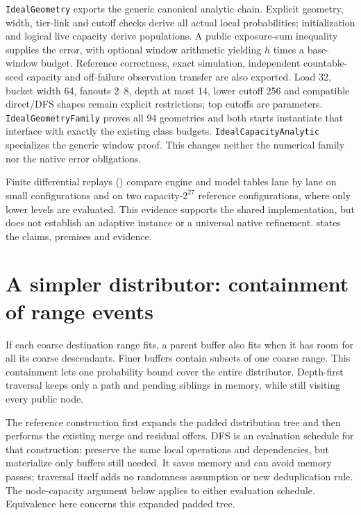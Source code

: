 \documentclass[11pt]{article}
\theoremstyle{definition}
\theoremstyle{remark}
\begin{document}
\texttt{IdealGeometry} exports the generic canonical analytic chain.
Explicit geometry, width, tier-link and cutoff checks derive all actual local
probabilities; initialization and logical live capacity derive populations.
A public exposure-sum inequality supplies the error, with optional window
arithmetic yielding $h$ times a base-window budget. Reference correctness,
exact simulation, independent countable-seed capacity and off-failure
observation transfer are also exported. Load 32, bucket width 64, fanouts
2--8, depth at most 14, lower cutoff 256 and compatible direct/DFS shapes
remain explicit restrictions; top cutoffs are parameters.
\texttt{IdealGeometryFamily} proves all 94 geometries and both starts
instantiate that interface with exactly the existing class budgets.
\texttt{IdealCapacityAnalytic} specializes the generic window proof.
This changes neither the numerical family nor the native error obligations.

Finite differential replays () compare engine and model
tables lane by lane on small configurations and on two capacity-$2^{27}$
reference configurations, where only lower levels are evaluated. This evidence
supports the shared implementation, but does not establish an adaptive
instance or a universal native refinement.
 states the claims, premises and evidence.

\section{A simpler distributor: containment of range events}
\label{sec:dfs-theorem}
If each coarse destination range fits, a parent buffer also fits when it has
room for all its coarse descendants. Finer buffers contain subsets of one
coarse range. This containment lets one probability bound cover the entire
distributor. Depth-first traversal keeps only a path and pending siblings
in memory, while still visiting every public node.

The reference construction first expands the padded distribution tree and
then performs the existing merge and residual offers. DFS is an evaluation
schedule for that construction: preserve the same local operations and
dependencies, but materialize only buffers still needed. It saves memory
and can avoid memory passes; traversal itself adds no randomness assumption
or new deduplication rule. The node-capacity argument below applies to either
evaluation schedule. Equivalence here concerns this expanded padded tree.
\end{document}
